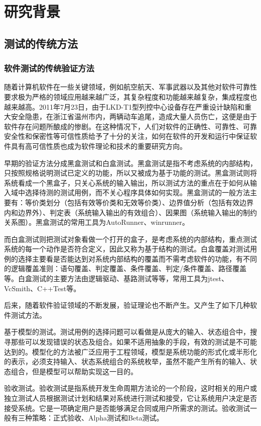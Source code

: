 ﻿\chapter{研究背景}
\section{测试的传统方法}
\subsection{软件测试的传统验证方法}
随着计算机软件在一些关键领域，例如航空航天、军事武器以及其他对软件可靠性要求极为严格的领域应用越来越广泛，其复杂程度和功能越来越复杂，集成程度也越来越高。2011年7月23日，由于LKD-T1型列控中心设备存在严重设计缺陷和重大安全隐患，在浙江省温州市内，两辆动车追尾，造成大量人员伤亡，这便是由于软件存在问题所酿成的惨剧。在这种情况下，人们对软件的正确性、可靠性、可靠安全性和保密性等可信性质给予了十分的关注，如何在软件的开发和运行中保证软件具有高可信性质也成为软件理论和技术的重要研究方向。

早期的验证方法分成黑盒测试和白盒测试。黑盒测试是指不考虑系统的内部结构，只按照规格说明测试已定义的功能，所以又被成为基于功能的测试。黑盒测试则将系统看成一个黑盒子，只关心系统的输入输出，所以测试方法的重点在于如何从输入域中选择待测的测试用例，而不关心程序具体如何实现。黑盒测试的一般方法主要有：等价类划分（包括有效等价类和无效等价类）、边界值分析（包括有效边界内和边界外）、判定表（系统输入输出的有效组合）、因果图（系统输入输出的制约关系图）。黑盒测试的常用工具为AutoRunner、winrunner。

而白盒测试则把测试对象看做一个打开的盒子，是考虑系统的内部结构，重点测试系统的每一个动作是否符合定义，因此又称为基于结构的测试。白盒覆盖对测试用例的选择主要看是否能达到对系统内部结构的覆盖而不需考虑软件的功能，有不同的逻辑覆盖准则：语句覆盖、判定覆盖、条件覆盖、判定/条件覆盖、路径覆盖等。白盒测试的主要方法由逻辑驱动、基路测试等等，常用工具为jtest、VcSmith、C++Test等。

后来，随着软件验证领域的不断发展，验证理论也不断产生。又产生了如下几种软件测试方法。

基于模型的测试。测试用例的选择问题可以看做是从庞大的输入、状态组合中，搜寻那些可以发现错误的状态及组合。如果不适用抽象的手段，有效的测试是不可能达到的。模型化的方法被广泛应用于工程领域，模型是系统功能的形式化或半形化的表示，必须支持输入、状态系统组合的系统枚举，虽然不能产生所有的输入、状态组合，但是模型可以帮助实现这一目的。

验收测试。验收测试是指系统开发生命周期方法论的一个阶段，这时相关的用户或独立测试人员根据测试计划和结果对系统进行测试和接受，它让系统用户决定是否接受系统。它是一项确定用户是否能够满足合同或用户所需求的测试。验收测试一般有三种策略：正式验收、Alpha测试和Beta测试。

